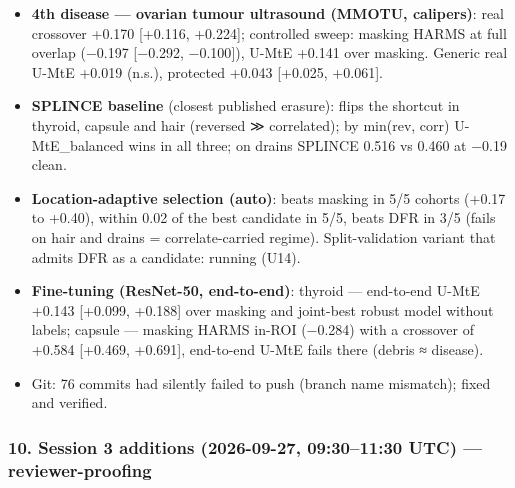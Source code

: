 {\begin{itemize}
\item
  \textbf{4th disease --- ovarian tumour ultrasound (MMOTU, calipers)}: real crossover +0.170 {[}+0.116, +0.224{]}; controlled
  sweep: masking HARMS at full overlap (−0.197 {[}−0.292, −0.100{]}), U-MtE +0.141 over masking. Generic real U-MtE
  +0.019 (n.s.), protected +0.043 {[}+0.025, +0.061{]}.
\item
  \textbf{SPLINCE baseline} (closest published erasure): flips the shortcut in thyroid, capsule and hair (reversed ≫
  correlated); by min(rev, corr) U-MtE\_balanced wins in all three; on drains SPLINCE 0.516 vs 0.460 at −0.19 clean.
\item
  \textbf{Location-adaptive selection (auto)}: beats masking in 5/5 cohorts (+0.17 to +0.40), within 0.02 of the best
  candidate in 5/5, beats DFR in 3/5 (fails on hair and drains = correlate-carried regime). Split-validation
  variant that admits DFR as a candidate: running (U14).
\item
  \textbf{Fine-tuning (ResNet-50, end-to-end)}: thyroid --- end-to-end U-MtE +0.143 {[}+0.099, +0.188{]} over masking and
  joint-best robust model without labels; capsule --- masking HARMS in-ROI (−0.284) with a crossover of +0.584
  {[}+0.469, +0.691{]}, end-to-end U-MtE fails there (debris ≈ disease).
\item
  Git: 76 commits had silently failed to push (branch name mismatch); fixed and verified.
\end{itemize}

\subsubsection{10. Session 3 additions (2026-09-27, 09:30--11:30 UTC) --- reviewer-proofing}\label{10-session-3-additions-2026-09-27-09301130-utc--reviewer-proofing}

\begin{itemize}


\end{itemize}}

